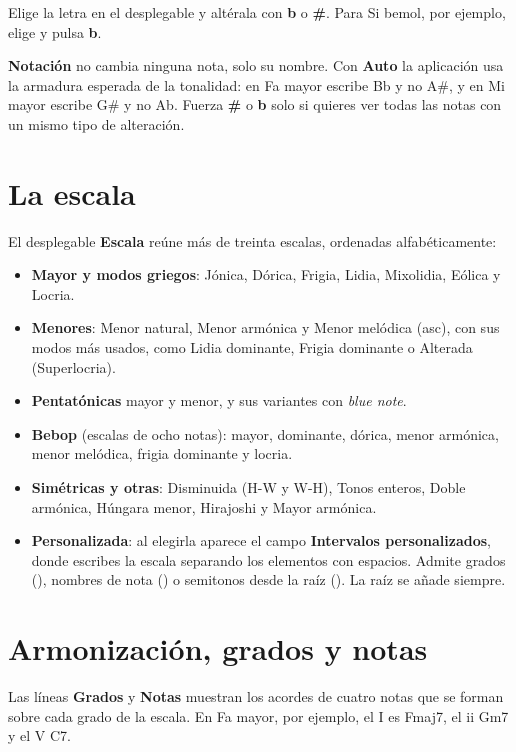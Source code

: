 \documentclass[a4paper,11pt,oneside]{report}
\providecommand{\tightlist}{\setlength{\itemsep}{2pt}\setlength{\parskip}{0pt}}
\let\originaltexttt\texttt
\renewcommand{\texttt}[1]{\originaltexttt{\seqsplit{#1}}}
\begin{document}
Elige la letra en el desplegable y altérala con \textbf{b} o \textbf{\#}. Para Si bemol, por ejemplo, elige \texttt{B} y pulsa \textbf{b}.

\textbf{Notación} no cambia ninguna nota, solo su nombre. Con \textbf{Auto} la aplicación usa la armadura esperada de la tonalidad: en Fa mayor escribe Bb y no A\#, y en Mi mayor escribe G\# y no Ab. Fuerza \textbf{\#} o \textbf{b} solo si quieres ver todas las notas con un mismo tipo de alteración.

\Needspace{3.5cm}
\section{La escala}\label{la-escala}

El desplegable \textbf{Escala} reúne más de treinta escalas, ordenadas alfabéticamente:

\begin{itemize}
\tightlist
\item
  \textbf{Mayor y modos griegos}: Jónica, Dórica, Frigia, Lidia, Mixolidia, Eólica y Locria.
\item
  \textbf{Menores}: Menor natural, Menor armónica y Menor melódica (asc), con sus modos más usados, como Lidia dominante, Frigia dominante o Alterada (Superlocria).
\item
  \textbf{Pentatónicas} mayor y menor, y sus variantes con \emph{blue note}.
\item
  \textbf{Bebop} (escalas de ocho notas): mayor, dominante, dórica, menor armónica, menor melódica, frigia dominante y locria.
\item
  \textbf{Simétricas y otras}: Disminuida (H-W y W-H), Tonos enteros, Doble armónica, Húngara menor, Hirajoshi y Mayor armónica.
\item
  \textbf{Personalizada}: al elegirla aparece el campo \textbf{Intervalos personalizados}, donde escribes la escala separando los elementos con espacios. Admite grados (\texttt{1\ b3\ 4\ 5\ b7}), nombres de nota (\texttt{F\ Ab\ C}) o semitonos desde la raíz (\texttt{s3}). La raíz se añade siempre.
\end{itemize}

\Needspace{3.5cm}
\section{Armonización, grados y notas}\label{armonizaciuxf3n-grados-y-notas}

Las líneas \textbf{Grados} y \textbf{Notas} muestran los acordes de cuatro notas que se forman sobre cada grado de la escala. En Fa mayor, por ejemplo, el I es Fmaj7, el ii Gm7 y el V C7.
\end{document}
